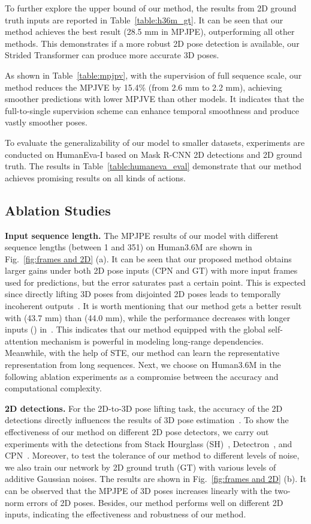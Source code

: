 \documentclass[journal]{IEEEtran}
\begin{document}
To further explore the upper bound of our method, the results from 2D ground truth inputs are reported in Table~\ref{table:h36m_gt}. 
It can be seen that our method achieves the best result (28.5 mm in MPJPE), outperforming all other methods. 
This demonstrates if a more robust 2D pose detection is available, our Strided Transformer can produce more accurate 3D poses. 

As shown in Table~\ref{table:mpjpv}, with the supervision of full sequence scale, our method reduces the MPJVE by 15.4\% (from 2.6 mm to 2.2 mm), achieving smoother predictions with lower MPJVE than other models.
It indicates that the full-to-single supervision scheme can enhance temporal smoothness and produce vastly smoother poses. 

To evaluate the generalizability of our model to smaller datasets, experiments are conducted on HumanEva-I based on Mask R-CNN 2D detections and 2D ground truth. 
The results in Table~\ref{table:humaneva_eval} demonstrate that our method achieves promising results on all kinds of actions. 

\subsection{Ablation Studies}
\textbf{Input sequence length.}
The MPJPE results of our model with different sequence lengths (between 1 and 351) on Human3.6M are shown in Fig.~\ref{fig:frames and 2D} (a). 
It can be seen that our proposed method obtains larger gains under both 2D pose inputs (CPN and GT) with more input frames used for predictions, but the error saturates past a certain point. 
This is expected since directly lifting 3D poses from disjointed 2D poses leads to temporally incoherent outputs~\cite{dabral2018learning}. 
It is worth mentioning that our method gets a better result with  (43.7 mm) than  (44.0 mm), while the performance decreases with longer inputs () in~\cite{liu2020attention}. 
This indicates that our method equipped with the global self-attention mechanism is powerful in modeling long-range dependencies. 
Meanwhile, with the help of STE, our method can learn the representative representation from long sequences. 
Next, we choose  on Human3.6M in the following ablation experiments as a compromise between the accuracy and computational complexity. 

\textbf{2D detections.}
For the 2D-to-3D pose lifting task, the accuracy of the 2D detections directly influences the results of 3D pose estimation~\cite{martinez2017simple}. 
To show the effectiveness of our method on different 2D pose detectors, we carry out experiments with the detections from Stack Hourglass (SH)~\cite{newell2016stacked}, Detectron~\cite{pavllo20193d}, and CPN~\cite{chen2018cascaded}. 
Moreover, to test the tolerance of our method to different levels of noise, we also train our network by 2D ground truth (GT) with various levels of additive Gaussian noises. 
The results are shown in Fig.~\ref{fig:frames and 2D} (b). 
It can be observed that the MPJPE of 3D poses increases linearly with the two-norm errors of 2D poses. 
Besides, our method performs well on different 2D inputs, indicating the effectiveness and robustness of our method.
\end{document}
